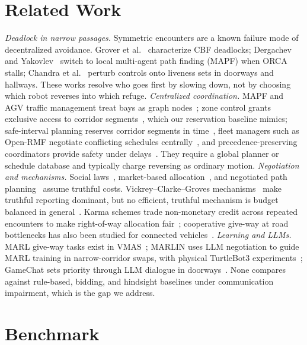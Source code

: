 \documentclass[letterpaper,journal]{IEEEtran}
\begin{document}
\section{Related Work}
\emph{Deadlock in narrow passages.} Symmetric encounters are a known failure mode of decentralized avoidance. Grover et al.~\cite{grover2023before} characterize CBF deadlocks; Dergachev and Yakovlev~\cite{dergachev2021distributed} switch to local multi-agent path finding (MAPF) when ORCA stalls; Chandra et al.~\cite{chandra2025deadlock} perturb controls onto liveness sets in doorways and hallways. These works resolve who goes first by slowing down, not by choosing which robot reverses into which refuge.
\emph{Centralized coordination.} MAPF and AGV traffic management treat bays as graph nodes~\cite{stern2019mapf,okumura2022pibt,experience2024narrow,macga2025}; zone control grants exclusive access to corridor segments~\cite{fanti2002event,geozone2023}, which our reservation baseline mimics; safe-interval planning reserves corridor segments in time~\cite{phillips2011sipp}, fleet managers such as Open-RMF negotiate conflicting schedules centrally~\cite{openrmf,rmftraffic}, and precedence-preserving coordinators provide safety under delays~\cite{cap2016provably,mannucci2019provably}. They require a global planner or schedule database and typically charge reversing as ordinary motion.
\emph{Negotiation and mechanisms.} Social laws~\cite{shoham1995social}, market-based allocation~\cite{gerkey2002sold}, and negotiated path planning~\cite{gautier2022negotiated} assume truthful costs. Vickrey--Clarke--Groves mechanisms~\cite{vickrey1961counterspeculation,clarke1971multipart,groves1973incentives,nisan2001algorithmic} make truthful reporting dominant, but no efficient, truthful mechanism is budget balanced in general~\cite{green1977characterization,myerson1983efficient}. Karma schemes trade non-monetary credit across repeated encounters to make right-of-way allocation fair~\cite{censi2019karma,elokda2024karma}; cooperative give-way at road bottlenecks has also been studied for connected vehicles~\cite{bottleneckiv2023}.
\emph{Learning and LLMs.} MARL give-way tasks exist in VMAS~\cite{vmasgiveway}; MARLIN uses LLM negotiation to guide MARL training in narrow-corridor swaps, with physical TurtleBot3 experiments~\cite{marlin2024}; GameChat sets priority through LLM dialogue in doorways~\cite{gamechat2025}. None compares against rule-based, bidding, and hindsight baselines under communication impairment, which is the gap we address.

\section{Benchmark}
\end{document}
